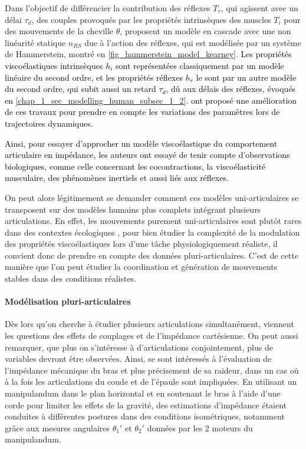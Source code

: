 Dans l'objectif de différencier la contribution des réflexes $T_r$, qui agissent avec un délai $\tau_d$, des couples provoqués par les propriétés intrinsèques des muscles $T_i$ pour des mouvements de la cheville $\theta$, \textcite{kearney_differential_1994, kearney_identification_1997} proposent un modèle en cascade avec une non linéarité statique $n_{RS}$ due à l'action des réflexes, qui est modélisée par un système de Hammerstein, montré en \cref{fig_hammerstein_model_kearney}. \textcolor{black}{Les propriétés viscoélastiques intrinsèques $h_i$ sont représentées classiquement par un modèle linéaire du second ordre, et les propriétés réflexes $h_r$ le sont par un autre modèle du second ordre, qui subit aussi un retard $\tau_d$, dû aux délais des réflexes, évoqués en \cref{chap_1_sec_modelling_human_subsec_1_2}. \textcite{ludvig_identification_2011} ont proposé une amélioration de ces travaux pour prendre en compte les variations des paramètres lors de trajectoires dynamiques.}



\textcolor{black}{Ainsi, pour essayer d'approcher un modèle viscoélastique du comportement articulaire en impédance, les auteurs ont essayé de tenir compte d'observations biologiques, comme celle concernant les cocontractions, la viscoélasticité musculaire, des phénomènes inertiels et aussi liés aux réflexes.}

On peut alors légitimement se demander comment ces modèles uni-articulaires se transposent sur des modèles humains plus complets intégrant plusieurs articulations. En effet, les mouvements purement uni-articulaires sont plutôt rares dans des contextes écologiques \parencite{hogan_mechanics_1985}, pour bien étudier la complexité de la modulation des propriétés viscoélastiques lors d'une tâche physiologiquement réaliste, il convient donc de prendre en compte des données pluri-articulaires. C'est de cette manière que l'on peut étudier la coordination et génération de mouvements stables dans des conditions réalistes.

\paragraph{Modélisation pluri-articulaires} 

Dès lors qu'on cherche à étudier plusieurs articulations simultanément, viennent les questions des effets de couplages et de l'impédance cartésienne. On peut aussi remarquer, que plus on s'intéresse à d'articulations conjointement, plus de variables devront être observées. Ainsi, \parencite{hogan_mechanics_1985, mussa-ivaldi_neural_1985} se sont intéressés à  l'évaluation de l'impédance mécanique du bras et plus précisement de sa raideur, dans un cas où à la fois les articulations du coude et de l'épaule sont impliquées. En utilisant un manipulandum dans le plan horizontal et en soutenant le bras à l'aide d'une corde pour limiter les effets de la gravité, des estimations d'impédance étaient conduites à différentes postures dans des conditions isométriques, notamment grâce aux mesures angulaires $\theta_1'$ et $\theta_2'$ données par les 2 moteurs du manipulandum. 

